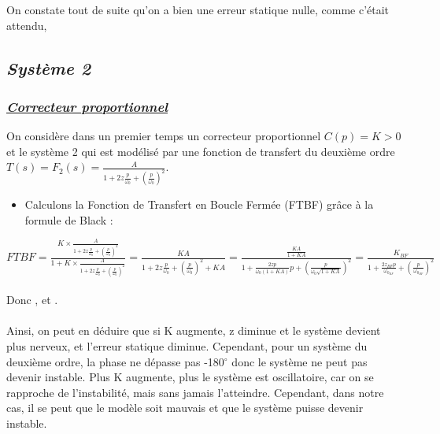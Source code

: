 \documentclass[12pt]{article}
\begin{document}
On constate tout de suite qu'on a bien une erreur statique nulle, comme c'était attendu, 


\subsection{\itshape Système 2}
\subsubsection{\underline{\itshape \bf Correcteur proportionnel}}
On considère dans un premier temps un correcteur proportionnel $C(p) = K > 0$ et le système 2 qui est modélisé par une fonction de transfert du deuxième ordre $T(s) = F_2(s) = \frac{A}{1 + 2z\frac{p}{\omega_0} + (\frac{p}{\omega_0})^2}$.
\begin{itemize}
    \item Calculons la Fonction de Transfert en Boucle Fermée (FTBF) grâce à la formule de Black : 
\end{itemize}

\large $FTBF = \frac{K\times \frac{A}{1 + 2z\frac{p}{\omega_0} + (\frac{p}{\omega_0})^2}}{1 + K\times \frac{A}{1 + 2z\frac{p}{\omega_0} + (\frac{p}{\omega_0})^2}} = \frac{KA}{1 + 2z\frac{p}{\omega_0} + (\frac{p}{\omega_0})^2 + KA} = \frac{\frac{KA}{1 + KA}}{1 + \frac{2zp}{\omega_0(1+KA)}p + (\frac{p}{\omega_0\sqrt{1+KA}})^2} = \frac{K_{BF}}{1 + \frac{2z_{BF}p}{\omega_{0_{BF}}}+ (\frac{p}{\omega_{0_{BF}}})^2}$
\\\\\normalsize Donc \large {},  \normalsize et \large {}.
\\\\ \normalsize Ainsi, on peut en déduire que si K augmente, z diminue et le système devient plus nerveux, et l'erreur statique diminue. Cependant, pour un système du deuxième ordre, la phase ne dépasse pas -180$^{\circ}$ donc le système ne peut pas devenir instable. Plus K augmente, plus le système est oscillatoire, car on se rapproche de l'instabilité, mais sans jamais l'atteindre. Cependant, dans notre cas, il se peut que le modèle soit mauvais et que le système puisse devenir instable.
\end{document}
